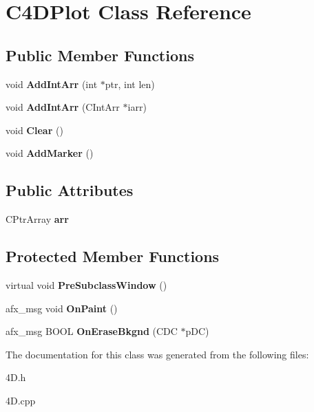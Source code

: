 \hypertarget{class_c4_d_plot}{\section{C4\-D\-Plot Class Reference}
\label{class_c4_d_plot}
}
\subsection*{Public Member Functions}
\begin{DoxyCompactItemize}
\item 
\hypertarget{class_c4_d_plot_a0ab3ca340fda2ca9b051d14cc5a0ce0c}{void {\bfseries Add\-Int\-Arr} (int $\ast$ptr, int len)}\label{class_c4_d_plot_a0ab3ca340fda2ca9b051d14cc5a0ce0c}

\item 
\hypertarget{class_c4_d_plot_a6e029f2fb59219a4e421ca015d7d9337}{void {\bfseries Add\-Int\-Arr} (C\-Int\-Arr $\ast$iarr)}\label{class_c4_d_plot_a6e029f2fb59219a4e421ca015d7d9337}

\item 
\hypertarget{class_c4_d_plot_a18e78bdbb654ed8b2bd92f0a9e1f4b7e}{void {\bfseries Clear} ()}\label{class_c4_d_plot_a18e78bdbb654ed8b2bd92f0a9e1f4b7e}

\item 
\hypertarget{class_c4_d_plot_a5673235f5b597f2dab2f6eaefa93b751}{void {\bfseries Add\-Marker} ()}\label{class_c4_d_plot_a5673235f5b597f2dab2f6eaefa93b751}

\end{DoxyCompactItemize}
\subsection*{Public Attributes}
\begin{DoxyCompactItemize}
\item 
\hypertarget{class_c4_d_plot_abd6114566b4a217d62cc3fd0078023f6}{C\-Ptr\-Array {\bfseries arr}}\label{class_c4_d_plot_abd6114566b4a217d62cc3fd0078023f6}

\end{DoxyCompactItemize}
\subsection*{Protected Member Functions}
\begin{DoxyCompactItemize}
\item 
\hypertarget{class_c4_d_plot_a037d53c244389ffeb65d97eb104309f0}{virtual void {\bfseries Pre\-Subclass\-Window} ()}\label{class_c4_d_plot_a037d53c244389ffeb65d97eb104309f0}

\item 
\hypertarget{class_c4_d_plot_a07f989df305530567f8ab17942059675}{afx\-\_\-msg void {\bfseries On\-Paint} ()}\label{class_c4_d_plot_a07f989df305530567f8ab17942059675}

\item 
\hypertarget{class_c4_d_plot_ae676a17be89b02ba26a649cb3405fc6e}{afx\-\_\-msg B\-O\-O\-L {\bfseries On\-Erase\-Bkgnd} (C\-D\-C $\ast$p\-D\-C)}\label{class_c4_d_plot_ae676a17be89b02ba26a649cb3405fc6e}

\end{DoxyCompactItemize}


The documentation for this class was generated from the following files\-:\begin{DoxyCompactItemize}
\item 
4\-D.\-h\item 
4\-D.\-cpp\end{DoxyCompactItemize}
